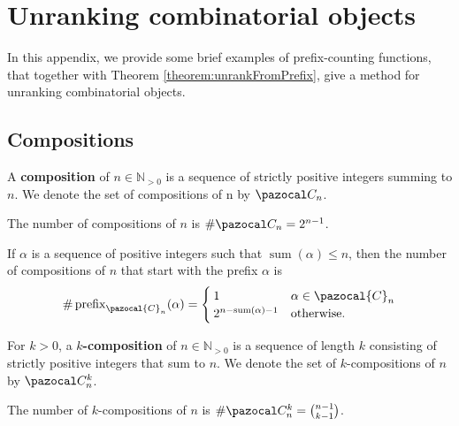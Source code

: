 \section{Unranking combinatorial objects}
\label{apndx:unranking}

In this appendix, we provide some brief examples of prefix-counting functions,
that together with Theorem \ref{theorem:unrankFromPrefix}, give a method for
unranking combinatorial objects.

\subsection{Compositions}
\begin{definition}
  A \textbf{composition} of $n \in \mathbb{N}_{>0}$ is a sequence of
  strictly positive integers summing to $n$. We denote the set of compositions
  of n by $\pazocal C_n$.
\end{definition}

\begin{lemma} %
  The number of compositions of $n$ is $\#\pazocal C_n = 2^{n-1}$.
\end{lemma}

\begin{proposition}
  If $\alpha$ is a sequence of positive integers such that
  $\operatorname{sum}(\alpha) \leq n$, then
  the number of compositions of $n$ that start with the prefix $\alpha$
  is \begin{equation}
    \#\operatorname{prefix}_{\pazocal{C}_n}(\alpha) = \begin{cases}
      1 & \alpha \in \pazocal{C}_n \\
      2^{n - \operatorname{sum}(\alpha) - 1} & \text{otherwise}.
    \end{cases}
  \end{equation}
\end{proposition}

\begin{definition}
  For $k > 0$, a $k$\textbf{-composition} of $n \in \mathbb{N}_{>0}$
  is a sequence of length $k$ consisting of strictly positive integers that sum
  to $n$. We denote the set of $k$-compositions of $n$ by $\pazocal C_n^{k}$.
\end{definition}

\begin{lemma}
  The number of $k$-compositions of $n$ is $\#\pazocal C_n^{k} = \binom{n-1}{k-1}$.
\end{lemma}

